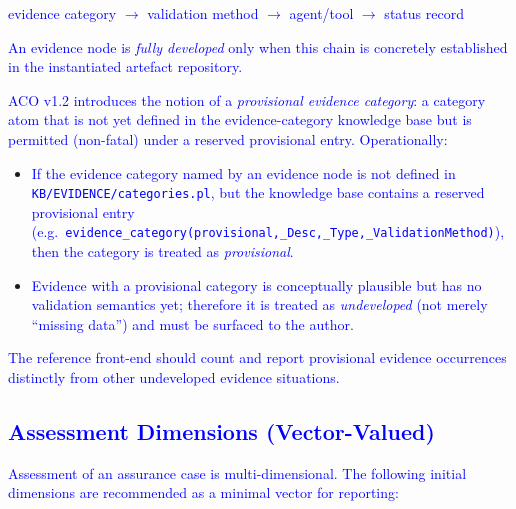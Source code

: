 \documentclass[11pt]{article}
\begin{document}
\begin{center}
\textcolor{blue}{evidence category $\rightarrow$ validation method $\rightarrow$ agent/tool $\rightarrow$ status record}
\end{center}

\textcolor{blue}{An evidence node is \emph{fully developed} only when this chain is concretely established in the instantiated artefact repository.}

\textcolor{blue}{ACO v1.2 introduces the notion of a \emph{provisional evidence category}: a category atom that is not yet defined in the evidence-category knowledge base but is permitted (non-fatal) under a reserved provisional entry. Operationally:}
\begin{itemize}[leftmargin=2em]
  \item \textcolor{blue}{If the evidence category named by an evidence node is not defined in \texttt{KB/EVIDENCE/categories.pl}, but the knowledge base contains a reserved provisional entry (e.g.\ \texttt{evidence\_category(provisional,\_Desc,\_Type,\_ValidationMethod)}), then the category is treated as \emph{provisional}.}
  \item \textcolor{blue}{Evidence with a provisional category is conceptually plausible but has no validation semantics yet; therefore it is treated as \emph{undeveloped} (not merely ``missing data'') and must be surfaced to the author.}
\end{itemize}

\textcolor{blue}{The reference front-end should count and report provisional evidence occurrences distinctly from other undeveloped evidence situations.}

\subsection{\textcolor{blue}{Assessment Dimensions (Vector-Valued)}}

\textcolor{blue}{Assessment of an assurance case is multi-dimensional. The following initial dimensions are recommended as a minimal vector for reporting:}
\end{document}
